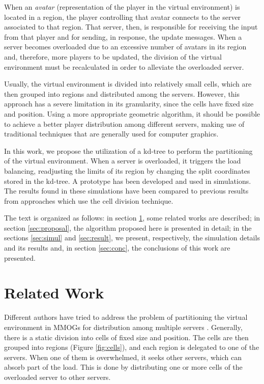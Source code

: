 \documentclass[acmtocl]{acmtrans2m}
\begin{document}
When an \emph{avatar} (representation of the player in the virtual environment) is located in a region, the player controlling that avatar connects to the server associated to that region. That server, then, is responsible for receiving the input from that player and for sending, in response, the update messages. When a server becomes overloaded due to an excessive number of avatars in its region and, therefore, more players to be updated, the division of the virtual environment must be recalculated in order to alleviate the overloaded server.

Usually, the virtual environment is divided into relatively small cells, which are then grouped into regions and distributed among the servers. However, this approach has a severe limitation in its granularity, since the cells have fixed size and position. Using a more appropriate geometric algorithm, it should be possible to achieve a better player distribution among different servers, making use of traditional techniques that are generally used for computer graphics.

In this work, we propose the utilization of a kd-tree to perform the partitioning of the virtual environment. When a server is overloaded, it triggers the load balancing, readjusting the limits of its region by changing the split coordinates stored in the kd-tree. A prototype has been developed and used in simulations. The results found in these simulations have been compared to previous results from approaches which use the cell division technique.

The text is organized as follows: in section \ref{context}, some related works are described; in section \ref{sec:proposal}, the algorithm proposed here is presented in detail; in the sections \ref{sec:simul} and \ref{sec:result}, we present, respectively, the simulation details and its results and, in section \ref{sec:conc}, the conclusions of this work are presented.


\section{Related Work}
\label{context}

Different authors have tried to address the problem of partitioning the virtual environment in MMOGs for distribution among multiple servers \cite{ahmed2008mol,bezerra2009lbs}. Generally, there is a static division into cells of fixed size and position. The cells are then grouped into regions (Figure \ref{fig:cells}), and each region is delegated to one of the servers. When one of them is overwhelmed, it seeks other servers, which can absorb part of the load. This is done by distributing one or more cells of the overloaded server to other servers.
\end{document}
